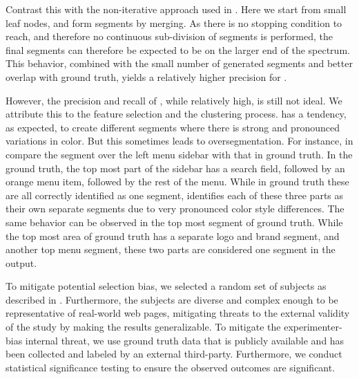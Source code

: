 Contrast this with the non-iterative approach used in \toolname.
Here we start from small leaf nodes, and form segments
by merging. As there is no stopping condition to reach,
and therefore no continuous sub-division of segments is performed,
the final segments can therefore be expected
to be on the larger end of the spectrum.
This behavior, combined with the small number of generated segments
and better overlap with ground truth,
yields a relatively higher precision for \toolname.

However, the precision and recall of \toolname,
while relatively high, is still not ideal.
We attribute this to the feature selection and the clustering process.
\toolname has a tendency, as expected, to create different segments where there is
strong and pronounced variations in color. But this sometimes leads to oversegmentation.
For instance, in  compare the \toolname segment
over the left menu sidebar with that in ground truth.
In the ground truth,
the top most part of the sidebar has a search field,
followed by an orange menu item,
followed by the rest of the menu.
While in ground truth these are all correctly identified as one segment,
\toolname identifies each of these three parts as their own separate segments
due to very pronounced color style differences.
The same behavior can be observed in the top most segment of ground truth.
While the top most area of ground truth has a separate logo and brand segment,
and another top menu segment,
these two parts are considered one segment in the \toolname output.

To mitigate potential selection bias,
we selected a random set of subjects as described in .
Furthermore, the subjects are diverse and complex enough to be
representative of real-world web pages,
mitigating threats to the external validity of the study by making the results generalizable.
To mitigate the experimenter-bias internal threat,
we use ground truth data that is publicly available and has been collected and labeled
by an external third-party.
Furthermore, we conduct statistical significance testing
to ensure the observed outcomes are significant.

